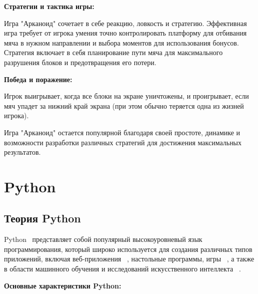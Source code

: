  \textbf{Стратегии и тактика игры:}
 
Игра "Арканоид" сочетает в себе реакцию, ловкость и стратегию. Эффективная игра требует от игрока умения точно контролировать платформу для отбивания мяча в нужном направлении и выбора моментов для использования бонусов. Стратегия включает в себя планирование пути мяча для максимального разрушения блоков и предотвращения его потери.

 \textbf{Победа и поражение:}
 
Игрок выигрывает, когда все блоки на экране уничтожены, и проигрывает, если мяч упадет за нижний край экрана (при этом обычно теряется одна из жизней игрока).

Игра "Арканоид" остается популярной благодаря своей простоте, динамике и возможности разработки различных стратегий для достижения максимальных результатов.


\section{\label{sec:ch01/sec02}Python}
    
\subsection{\label{subsec:ch01/sec02/sub01}Теория Python}
Python ~\cite{book1author}представляет собой популярный высокоуровневый язык программирования, который широко используется для создания различных типов приложений, включая веб-приложения ~\cite{book1author4}, настольные программы, игры ~\cite{book1author2}, а также в области машинного обучения и исследований искусственного интеллекта ~\cite{book1author3}.

\textbf{Основные характеристики Python:}

